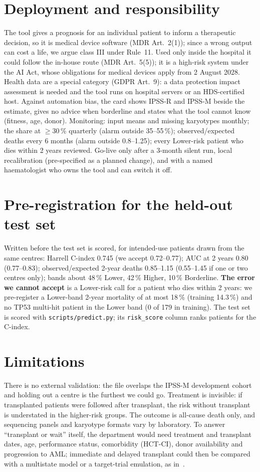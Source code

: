 \documentclass[11pt,a4paper]{article}
\begin{document}
\section{Deployment and responsibility}
The tool gives a prognosis for an individual patient to inform a therapeutic decision, so it is medical device software (MDR Art.~2(1)); since a wrong output can cost a life, we argue class III under Rule~11. Used only inside the hospital it could follow the in-house route (MDR Art.~5(5)); it is a high-risk system under the AI Act, whose obligations for medical devices apply from 2 August 2028. Health data are a special category (GDPR Art.~9): a data protection impact assessment is needed and the tool runs on hospital servers or an HDS-certified host. Against automation bias, the card shows IPSS-R and IPSS-M beside the estimate, gives no advice when borderline and states what the tool cannot know (fitness, age, donor). Monitoring: input means and missing karyotypes monthly; the share at $\geq 30$\,\% quarterly (alarm outside 35--55\,\%); observed/expected deaths every 6 months (alarm outside 0.8--1.25); every Lower-risk patient who dies within 2 years reviewed. Go-live only after a 3-month silent run, local recalibration (pre-specified as a planned change), and with a named haematologist who owns the tool and can switch it off.

\section{Pre-registration for the held-out test set}
Written before the test set is scored, for intended-use patients drawn from the same centres: Harrell C-index 0.745 (we accept 0.72--0.77); AUC at 2 years 0.80 (0.77--0.83); observed/expected 2-year deaths 0.85--1.15 (0.55--1.45 if one or two centres only); bands about 48\,\% Lower, 42\,\% Higher, 10\,\% Borderline. \textbf{The error we cannot accept} is a Lower-risk call for a patient who dies within 2 years: we pre-register a Lower-band 2-year mortality of at most 18\,\% (training 14.3\,\%) and no TP53 multi-hit patient in the Lower band (0 of 179 in training). The test set is scored with \texttt{scripts/predict.py}; its \texttt{risk\_score} column ranks patients for the C-index.

\section{Limitations}
There is no external validation: the file overlaps the IPSS-M development cohort and holding out a centre is the furthest we could go. Treatment is invisible: if transplanted patients were followed after transplant, the risk without transplant is understated in the higher-risk groups. The outcome is all-cause death only, and sequencing panels and karyotype formats vary by laboratory. To answer ``transplant or wait'' itself, the department would need treatment and transplant dates, age, performance status, comorbidity (HCT-CI), donor availability and progression to AML; immediate and delayed transplant could then be compared with a multistate model or a target-trial emulation, as in~\cite{tentori}.
\end{document}
